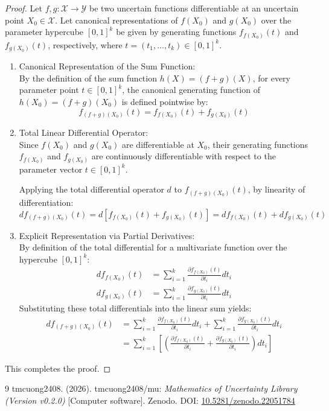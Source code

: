 \documentclass[a4paper,12pt, twoside]{memoir}
\begin{document}
\begin{proof}
	Let $f, g : \mathcal{X} \to \mathcal{Y}$ be two uncertain functions differentiable at an uncertain point $X_0 \in \mathcal{X}$. Let canonical representations of $f(X_0)$ and $g(X_0)$ over the parameter hypercube $[0, 1]^k$ be given by generating functions $f_{f(X_0)}(t)$ and $f_{g(X_0)}(t)$, respectively, where $t = (t_1, \dots, t_k) \in [0, 1]^k$.

	\begin{enumerate}[leftmargin=*]
		\item Canonical Representation of the Sum Function: \\
		      By the definition of the sum function $h(X) = (f + g)(X)$, for every parameter point $t \in [0, 1]^k$, the canonical generating function of $h(X_0) = (f+g)(X_0)$ is defined pointwise by:
		      \[
			      f_{(f+g)(X_0)}(t) = f_{f(X_0)}(t) + f_{g(X_0)}(t)
		      \]

		\item Total Linear Differential Operator: \\
		      Since $f(X_0)$ and $g(X_0)$ are differentiable at $X_0$, their generating functions $f_{f(X_0)}$ and $f_{g(X_0)}$ are continuously differentiable with respect to the parameter vector $t \in [0, 1]^k$.

		      Applying the total differential operator $d$ to $f_{(f+g)(X_0)}(t)$, by linearity of differentiation:
		      \[
			      d f_{(f+g)(X_0)}(t) = d \left[ f_{f(X_0)}(t) + f_{g(X_0)}(t) \right] = d f_{f(X_0)}(t) + d f_{g(X_0)}(t)
		      \]

		\item Explicit Representation via Partial Derivatives: \\
		      By definition of the total differential for a multivariate function over the hypercube $[0, 1]^k$:
		      \begin{align*}
			      d f_{f(X_0)}(t) & = \sum_{i=1}^{k} \frac{\partial f_{f(X_0)}(t)}{\partial t_i} dt_i \\
			      d f_{g(X_0)}(t) & = \sum_{i=1}^{k} \frac{\partial f_{g(X_0)}(t)}{\partial t_i} dt_i
		      \end{align*}
		      Substituting these total differentials into the linear sum yields:
		      \begin{align*}
			      d f_{(f+g)(X_0)}(t) & = \sum_{i=1}^{k} \frac{\partial f_{f(X_0)}(t)}{\partial t_i} dt_i + \sum_{i=1}^{k} \frac{\partial f_{g(X_0)}(t)}{\partial t_i} dt_i           \\
			                          & = \sum_{i=1}^{k} \left[ \left( \frac{\partial f_{f(X_0)}(t)}{\partial t_i} + \frac{\partial f_{g(X_0)}(t)}{\partial t_i} \right) dt_i \right]
		      \end{align*}
	\end{enumerate}
	This completes the proof.
\end{proof}

\begin{thebibliography}{9}
	tmcuong2408. (2026). tmcuong2408/mu: \textit{Mathematics of Uncertainty Library (Version v0.2.0)} [Computer software]. Zenodo.
	DOI: \href{https://doi.org/10.5281/zenodo.22051784}{10.5281/zenodo.22051784}
\end{thebibliography}
\end{document}
